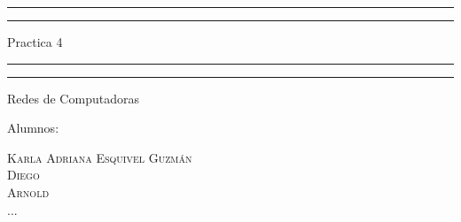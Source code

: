 \documentclass[a4paper, 11pt, oneside]{book} %
\begin{document}
 

\begin{titlepage} %

	\centering %
	
	\scshape %
	
	\vspace*{\baselineskip} %
	
	
	\rule{\textwidth}{1.6pt}\vspace*{-\baselineskip}\vspace*{2pt} %
	\rule{\textwidth}{0.4pt} %
	
	\vspace{0.75\baselineskip} %
	
	{\LARGE Practica 4}	
	\vspace{0.75\baselineskip} %
	
	\rule{\textwidth}{0.4pt}\vspace*{-\baselineskip}\vspace{3.2pt} %
	\rule{\textwidth}{1.6pt} %
	
	\vspace{2\baselineskip} %
	
	Redes de Computadoras
	
	\vspace*{3\baselineskip} %
	
	
	Alumnos:
	
	\vspace{0.5\baselineskip} %
	
	{\scshape\Large Karla Adriana Esquivel Guzmán \\} %
	{\scshape\Large Diego \\} %
	{\scshape\Large Arnold \\} %
	{\scshape\Large ... \\} %
	\vspace{0.5\baselineskip} %
	

\end{titlepage}
\end{document}
